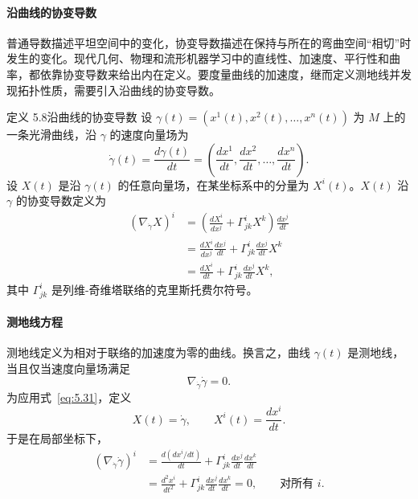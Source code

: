 \paragraph{沿曲线的协变导数}
普通导数描述平坦空间中的变化，协变导数描述在保持与所在的弯曲空间“相切”时发生的变化。现代几何、物理和流形机器学习中的直线性、加速度、平行性和曲率，都依靠协变导数来给出内在定义。要度量曲线的加速度，继而定义测地线并发现拓扑性质，需要引入沿曲线的协变导数。

\begin{statement}{定义 5.8}{沿曲线的协变导数}
设 $\gamma(t)=(x^1(t),x^2(t),\ldots,x^n(t))$ 为 $M$ 上的一条光滑曲线，沿 $\gamma$ 的速度向量场为
\[
  \dot\gamma(t)=\frac{d\gamma(t)}{dt}
    =\left(\frac{dx^1}{dt},\frac{dx^2}{dt},\ldots,\frac{dx^n}{dt}\right).
\]
设 $X(t)$ 是沿 $\gamma(t)$ 的任意向量场，在某坐标系中的分量为 $X^i(t)$。$X(t)$ 沿 $\gamma$ 的协变导数定义为
\begin{equation*}
  \begin{aligned}
    (\nabla_{\dot\gamma}X)^i
      &=\left(\frac{dX^i}{dx^j}+\Gamma^i_{jk}X^k\right)\frac{dx^j}{dt}\\
      &=\frac{dX^i}{dx^j}\frac{dx^j}{dt}
        +\Gamma^i_{jk}\frac{dx^j}{dt}X^k\\
      &=\frac{dX^i}{dt}+\Gamma^i_{jk}\frac{dx^j}{dt}X^k,
  \end{aligned}
  \tag{5.31}\label{eq:5.31}
\end{equation*}
其中 $\Gamma^i_{jk}$ 是列维-奇维塔联络的克里斯托费尔符号。
\end{statement}

\paragraph{测地线方程}
测地线定义为相对于联络的加速度为零的曲线。换言之，曲线 $\gamma(t)$ 是测地线，当且仅当速度向量场满足
\begin{equation*}
  \nabla_{\dot\gamma}\dot\gamma=0.
  \tag{5.32}\label{eq:5.32}
\end{equation*}
为应用式~\eqref{eq:5.31}，定义
\[
  X(t)=\dot\gamma,\qquad X^i(t)=\frac{dx^i}{dt}.
\]
于是在局部坐标下，
\begin{equation*}
  \begin{aligned}
    (\nabla_{\dot\gamma}\dot\gamma)^i
     &=\frac{d(dx^i/dt)}{dt}
       +\Gamma^i_{jk}\frac{dx^j}{dt}\frac{dx^k}{dt}\\
     &=\frac{d^2x^i}{dt^2}+\Gamma^i_{jk}\frac{dx^j}{dt}\frac{dx^k}{dt}
       =0,\qquad \text{对所有 }i.
  \end{aligned}
  \tag{5.33}\label{eq:5.33}
\end{equation*}

